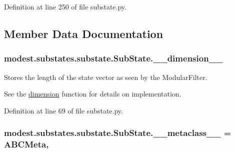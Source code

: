 Definition at line 250 of file substate.\+py.



\subsection{Member Data Documentation}
\subsubsection[{\texorpdfstring{\+\_\+\+\_\+dimension\+\_\+\+\_\+}{__dimension__}}]{\setlength{\rightskip}{0pt plus 5cm}modest.\+substates.\+substate.\+Sub\+State.\+\_\+\+\_\+dimension\+\_\+\+\_\+\hspace{0.3cm}{\ttfamily [private]}}\hypertarget{classmodest_1_1substates_1_1substate_1_1SubState_a5b1c0756a69da7f293a415c7d2d77843}{}\label{classmodest_1_1substates_1_1substate_1_1SubState_a5b1c0756a69da7f293a415c7d2d77843}


Stores the length of the state vector as seen by the Modular\+Filter. 

See the \hyperlink{classmodest_1_1substates_1_1substate_1_1SubState_ab9027f6d1d7d57c47731612f519b7ee6}{dimension} function for details on implementation. 

Definition at line 69 of file substate.\+py.

\subsubsection[{\texorpdfstring{\+\_\+\+\_\+metaclass\+\_\+\+\_\+}{__metaclass__}}]{\setlength{\rightskip}{0pt plus 5cm}modest.\+substates.\+substate.\+Sub\+State.\+\_\+\+\_\+metaclass\+\_\+\+\_\+ = A\+B\+C\+Meta\hspace{0.3cm}{\ttfamily [static]}, {\ttfamily [private]}}\hypertarget{classmodest_1_1substates_1_1substate_1_1SubState_a31b0d49b08a8cd07b6d6e4b646d2a307}{}\label{classmodest_1_1substates_1_1substate_1_1SubState_a31b0d49b08a8cd07b6d6e4b646d2a307}



